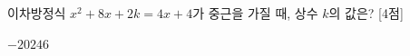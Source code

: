 이차방정식 $x^2+8x+2k=4x+4$가 중근을 가질 때, 상수 $k$의 값은? \mbox{[4점]}
\begin{choices32}{$-2$}{$0$}{$2$}{$4$}{$6$}\end{choices32}
